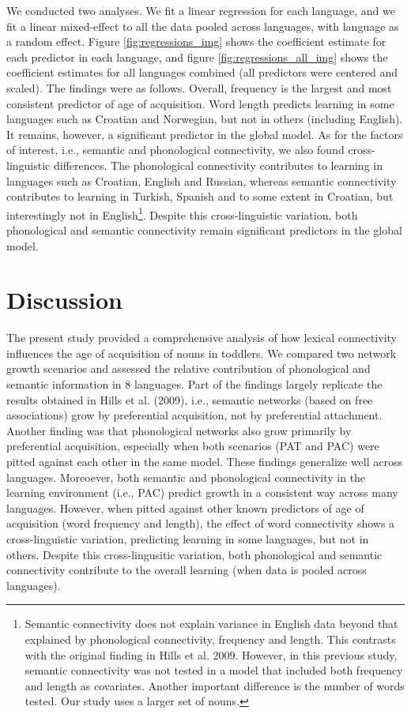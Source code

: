 \documentclass[10pt, letterpaper]{article}
\begin{document}
We conducted two analyses. We fit a linear regression for each language,
and we fit a linear mixed-effect to all the data pooled across
languages, with language as a random effect. Figure
\ref{fig:regressions_img} shows the coefficient estimate for each
predictor in each language, and figure \ref{fig:regressions_all_img}
shows the coefficient estimates for all languages combined (all
predictors were centered and scaled). The findings were as follows.
Overall, frequency is the largest and most consistent predictor of age
of acquisition. Word length predicts learning in some languages such as
Croatian and Norwegian, but not in others (including English). It
remains, however, a significant predictor in the global model. As for
the factors of interest, i.e., semantic and phonological connectivity,
we also found cross-linguistic differences. The phonological
connectivity contributes to learning in languages such as Croatian,
English and Russian, whereas semantic connectivity contributes to
learning in Turkish, Spanish and to some extent in Croatian, but
interestingly not in
English\footnote{Semantic connectivity does not explain variance in English data beyond that explained by phonological connectivity, frequency and length. This contrasts with the original finding in Hills et al. 2009. However, in this previous study, semantic connectivity was not tested in a model that included both frequency and length as covariates. Another important difference is the number of words tested. Our study uses a larger set of nouns.}.
Despite this cross-linguistic variation, both phonological and semantic
connectivity remain significant predictors in the global model.

\section{Discussion}\label{discussion}

The present study provided a comprehensive analysis of how lexical
connectivity influences the age of acquisition of nouns in toddlers. We
compared two network growth scenarios and assessed the relative
contribution of phonological and semantic information in 8 languages.
Part of the findings largely replicate the results obtained in Hills et
al. (2009), i.e., semantic networks (based on free associations) grow by
preferential acquisition, not by preferential attachment. Another
finding was that phonological networks also grow primarily by
preferential acquisition, especially when both scenarios (PAT and PAC)
were pitted against each other in the same model. These findings
generalize well across languages. Moreoever, both semantic and
phonological connectivity in the learning environment (i.e., PAC)
predict growth in a consistent way across many languages. However, when
pitted against other known predictors of age of acquisition (word
frequency and length), the effect of word connectivity shows a
cross-linguistic variation, predicting learning in some languages, but
not in others. Despite this cross-lingusitic variation, both
phonological and semantic connectivity contribute to the overall
learning (when data is pooled across languages).
\end{document}
